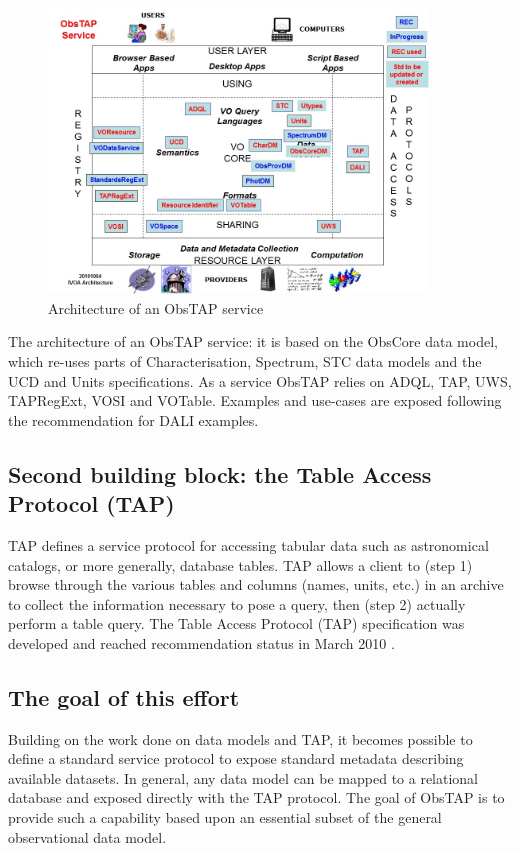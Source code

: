 \documentclass[11pt,a4paper]{ivoa}
\begin{document}
\begin{figure}[H]
\centering
\includegraphics[width=0.9\textwidth]{role_diagram.jpg}
\caption{Architecture of an ObsTAP service}
\label{fig:archdiag}
\end{figure}
The architecture of an ObsTAP service: it is based on the ObsCore data model,
which re-uses parts of Characterisation, Spectrum, STC data models and the UCD and Units specifications. As a service
ObsTAP relies on ADQL, TAP, UWS, TAPRegExt, VOSI and VOTable. Examples and use-cases are exposed following the
recommendation for DALI examples.


\subsection{Second building block: the Table Access Protocol (TAP)}
TAP defines a service protocol for accessing tabular data such as astronomical catalogs, or more generally, database
tables.  TAP allows a client to (step 1) browse through the various tables and columns (names, units, etc.) in an
archive to collect the information necessary to pose a query, then (step 2) actually perform a table query.  The Table
Access Protocol (TAP) specification was developed and reached recommendation status in March 2010
\citep{2010ivoa.spec.0327D}.

\subsection{The goal of this effort}
Building on the work done on data models and TAP, it becomes possible to define a standard service protocol to expose
standard metadata describing available datasets.  In general, any data model can be mapped to a relational database and
exposed directly with the TAP protocol.  The goal of ObsTAP is to provide such a capability based upon an essential
subset of the general observational data model.
\end{document}
